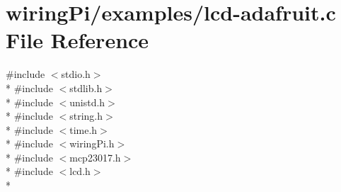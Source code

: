 \hypertarget{lcd-adafruit_8c}{\section{wiring\-Pi/examples/lcd-\/adafruit.c File Reference}
\label{lcd-adafruit_8c}
}
{\ttfamily \#include $<$stdio.\-h$>$}\\*
{\ttfamily \#include $<$stdlib.\-h$>$}\\*
{\ttfamily \#include $<$unistd.\-h$>$}\\*
{\ttfamily \#include $<$string.\-h$>$}\\*
{\ttfamily \#include $<$time.\-h$>$}\\*
{\ttfamily \#include $<$wiring\-Pi.\-h$>$}\\*
{\ttfamily \#include $<$mcp23017.\-h$>$}\\*
{\ttfamily \#include $<$lcd.\-h$>$}\\*
